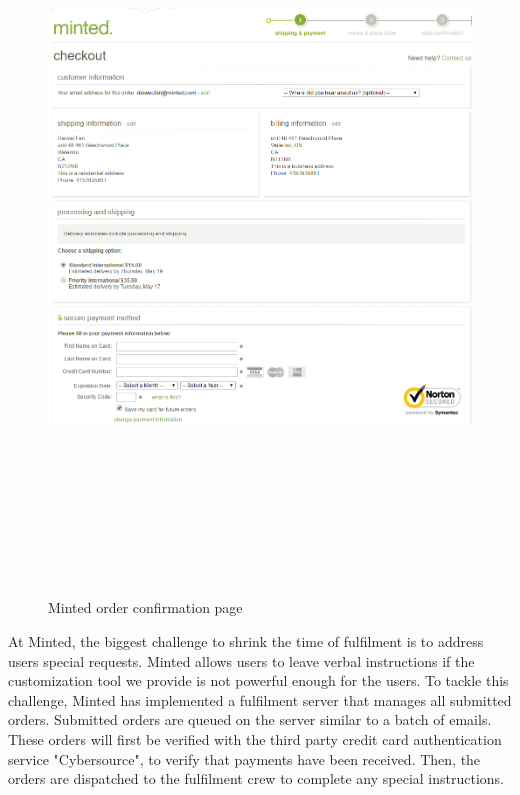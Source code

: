 \documentclass[12pt]{article}
\begin{document}
\begin{figure}[ht!]
\centering
\includegraphics[width=15cm,height=20cm,keepaspectratio]{img/order.png}
\caption{Minted order confirmation page}
\label{overflow}
\end{figure}

At Minted, the biggest challenge to shrink the time of fulfilment is to address users special requests. Minted allows users to leave verbal instructions if the customization tool we provide is not powerful enough for the users. To tackle this challenge, Minted has implemented a fulfilment server that manages all submitted orders. Submitted orders are queued on the server similar to a batch of emails. These orders will first be verified with the third party credit card authentication service "Cybersource", to verify that payments have been received. Then, the orders are dispatched to the fulfilment crew to complete any special instructions. \\
\end{document}
